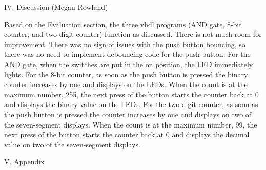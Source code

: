 \documentclass{article}
\begin{document}
\begin{multicols*}{2}
\begin{center}
{\large IV. Discussion (Megan Rowland)}
\end{center}
Based on the Evaluation section, the three vhdl programs (AND gate, 8-bit counter, and two-digit counter) function as discussed. There is not much room for improvement. There was no sign of issues with the push button bouncing, so there was no need to implement debouncing code for the push button.
For the AND gate, when the switches are put in the on position, the LED immediately lights. For the 8-bit counter, as soon as the push button is pressed the binary counter increases by one and displays on the LEDs. When the count is at the maximum number, 255, the next press of the button starts the counter back at 0 and displays the binary value on the LEDs. For the two-digit counter, as soon as the push button is pressed the counter increases by one and displays on two of the seven-segment displays. When the count is at the maximum number, 99, the next press of the button starts the counter back at 0 and displays the decimal value on two of the seven-segment displays.




\begin{center}
{\large V. Appendix}
\end{center}

\end{multicols*}













\end{document}
